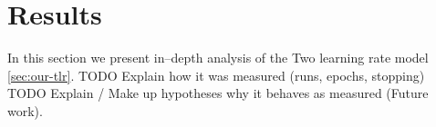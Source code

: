

\section{Results} 
\label{sec:analysis}
\label{sec:results} 

In this section we present in--depth analysis of the Two learning rate model \ref{sec:our-tlr}.  
TODO Explain how it was measured (runs, epochs, stopping) \\
TODO Explain / Make up hypotheses why it behaves as measured (Future work). \\

 

 

 

 

 

 


